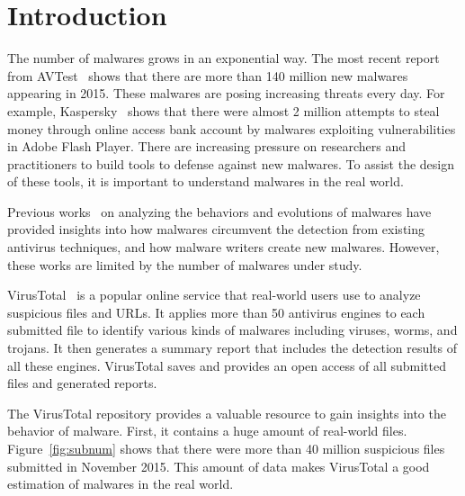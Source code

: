 
\section{Introduction}

The number of malwares grows in an exponential way. 
The most recent report from AVTest~\cite{avtest} shows that there are more than 140 million new malwares appearing in 2015. 
These malwares are posing increasing threats every day. For example, 
Kaspersky~\cite{kaspersky} shows that there were almost 2 million attempts to steal money through online access bank account 
by malwares exploiting vulnerabilities in Adobe Flash Player. 
There are increasing pressure on researchers and practitioners 
to build tools to defense against new malwares. 
To assist the design of these tools, it is important to understand malwares in the real world. 




Previous works~\cite{ZhouSP2012,GuptaComsnets2009} on analyzing the behaviors and evolutions of malwares have provided insights 
into how malwares circumvent the detection from existing antivirus techniques, and how malware writers create new malwares. 
However, these works are limited by the number of malwares under study. 

VirusTotal~\cite{virustotal} is a popular online service that real-world users use to analyze suspicious files and URLs.
It applies more than 50 antivirus engines to each submitted file 
to identify various kinds of malwares including viruses, worms, and trojans. 
It then generates a summary report that includes the detection results of all these engines. 
VirusTotal saves and provides an open access of all submitted files and generated reports. 

The VirusTotal repository provides a valuable resource to gain insights into 
the behavior of malware.
%
First, it contains a huge amount of real-world files.
Figure~\ref{fig:subnum} shows that there were more than 40 million suspicious files 
submitted in November 2015. 
This amount of data makes VirusTotal a good estimation of malwares in the real world. 

